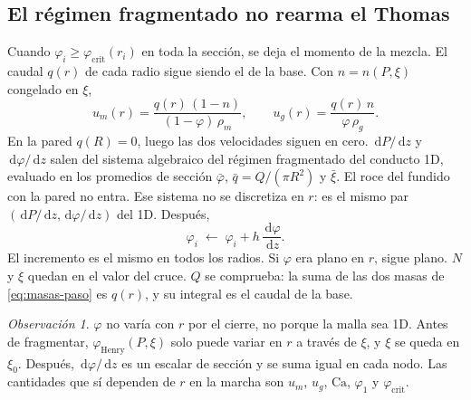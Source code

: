 \documentclass[11pt,a4paper]{article}
\newcommand{\dd}{\,\mathrm{d}}
\theoremstyle{plain}
\theoremstyle{definition}
\theoremstyle{remark}
\newtheorem*{obs}{Observación}
\begin{document}
\subsection{El régimen fragmentado no rearma el Thomas}

Cuando \(\varphi_i\ge\varphi_{\mathrm{crit}}(r_i)\) en toda la sección, se
deja el momento de la mezcla. El caudal \(q(r)\) de cada radio sigue siendo
el de la base. Con \(n=n(P,\xi)\) congelado en \(\xi\),
\begin{equation}
u_m(r)=\frac{q(r)\,(1-n)}{(1-\varphi)\,\rho_m},
\qquad
u_g(r)=\frac{q(r)\,n}{\varphi\,\rho_g}.
\label{eq:masas-paso}
\end{equation}
En la pared \(q(R)=0\), luego las dos velocidades siguen en cero.
\(\dd P/\dd z\) y \(\dd\varphi/\dd z\) salen del sistema algebraico del
régimen fragmentado del conducto 1D, evaluado en los promedios de sección
\(\bar\varphi\), \(\bar q=Q/(\pi R^2)\) y \(\bar\xi\). El roce del fundido
con la pared no entra. Ese sistema no se discretiza en \(r\): es el mismo
par \((\dd P/\dd z,\dd\varphi/\dd z)\) del 1D. Después,
\begin{equation}
\varphi_i\;\longleftarrow\;\varphi_i+h\,\frac{\dd\varphi}{\dd z}.
\label{eq:phi-plano}
\end{equation}
El incremento es el mismo en todos los radios. Si \(\varphi\) era plano en
\(r\), sigue plano. \(N\) y \(\xi\) quedan en el valor del cruce.
\(Q\) se comprueba: la suma de las dos masas de \eqref{eq:masas-paso} es
\(q(r)\), y su integral es el caudal de la base.

\begin{obs}
\(\varphi\) no varía con \(r\) por el cierre, no porque la malla sea 1D.
Antes de fragmentar, \(\varphi_{\mathrm{Henry}}(P,\xi)\) solo puede variar
en \(r\) a través de \(\xi\), y \(\xi\) se queda en \(\xi_0\).
Después, \(\dd\varphi/\dd z\) es un escalar de sección y se suma igual en
cada nodo. Las cantidades que sí dependen de \(r\) en la marcha son
\(u_m\), \(u_g\), \(\mathrm{Ca}\), \(\varphi_1\) y \(\varphi_{\mathrm{crit}}\).
\end{obs}
\end{document}
